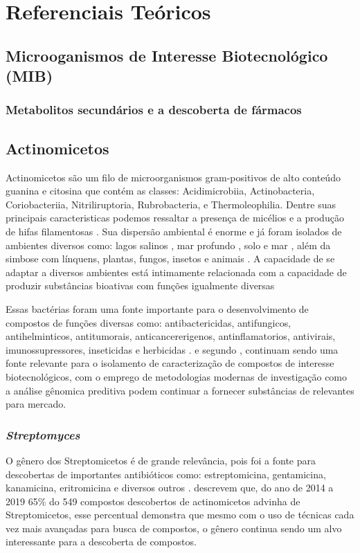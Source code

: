 \chapter{Referenciais Teóricos}
\label{cap:referenciais_teoricos}

\section{Microoganismos de Interesse Biotecnológico (MIB)}

\subsection{Metabolitos secundários e a descoberta de fármacos}

\section{Actinomicetos}
Actinomicetos são um filo de microorganismos gram-positivos de alto conteúdo
guanina e citosina que contém as classes: Acidimicrobiia, Actinobacteria, 
Coriobacteriia, Nitriliruptoria, Rubrobacteria, e Thermoleophilia\cite{yadav2018}.
Dentre suas principais caracteristicas podemos ressaltar a presença de micélios
e a produção de hifas filamentosas \cite{chater2016}. Sua dispersão ambiental é enorme
e já foram isolados de ambientes diversos como: lagos salinos \cite{flores2021}, mar profundo \cite{felicio2021},
solo \cite{sapkota2020} e mar \cite{jagannathan2021}, além da simbose com línquens, plantas, fungos, insetos e animais \cite{hei2021,van2017}.
A capacidade de se adaptar a diversos ambientes está intimamente relacionada com a capacidade
de produzir substâncias bioativas com funções igualmente diversas  \cite{van2020}

Essas bactérias foram uma fonte importante para o desenvolvimento de compostos de funções
diversas como: antibactericidas, antifungicos, antihelminticos, antitumorais, anticancererigenos,
antinflamatorios, antivirais, imunossupressores, inseticidas e herbicidas \cite{demain2009,jose2021}.
e segundo , continuam sendo uma fonte relevante
para o isolamento de caracterização de compostos de interesse biotecnológicos, com o
emprego de metodologias modernas de investigação como a análise gênomica preditiva
podem continuar a fornecer substâncias de relevantes para mercado.

\subsection{\textit{Streptomyces}}
O gênero dos Streptomicetos é de grande relevância, pois foi a fonte para descobertas de importantes antibióticos 
como: estreptomicina, gentamicina, kanamicina, eritromicina e diversos outros \cite{demain2009}.
 descrevem que, do ano de 2014 a 2019 65\% do 549 compostos descobertos
de actinomicetos advinha de Streptomicetos, esse percentual demonstra que mesmo com o uso de técnicas
cada vez mais avançadas para busca de compostos, o gênero continua sendo um alvo interessante
para a descoberta de compostos. 



